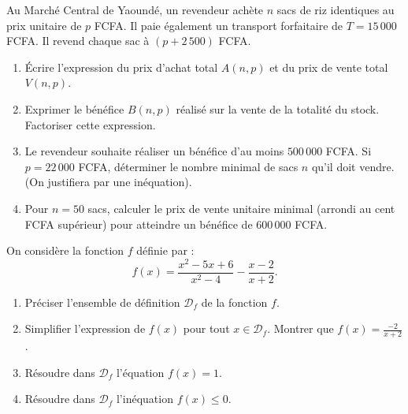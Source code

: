 \documentclass[11pt]{article}
\begin{document}
\begin{exercice}
Au Marché Central de Yaoundé, un revendeur achète $n$ sacs de riz identiques au prix unitaire de $p$ FCFA. Il paie également un transport forfaitaire de $T = 15\,000$ FCFA. Il revend chaque sac à $(p + 2\,500)$ FCFA.
\begin{enumerate}
    \item Écrire l'expression du prix d'achat total $A(n,p)$ et du prix de vente total $V(n,p)$.
    \item Exprimer le bénéfice $B(n,p)$ réalisé sur la vente de la totalité du stock. Factoriser cette expression.
    \item Le revendeur souhaite réaliser un bénéfice d'au moins $500\,000$ FCFA. Si $p = 22\,000$ FCFA, déterminer le nombre minimal de sacs $n$ qu'il doit vendre. (On justifiera par une inéquation).
    \item Pour $n = 50$ sacs, calculer le prix de vente unitaire minimal (arrondi au cent FCFA supérieur) pour atteindre un bénéfice de $600\,000$ FCFA.
\end{enumerate}
\end{exercice}

\begin{exercice}
On considère la fonction $f$ définie par :
\[
f(x) = \frac{x^2 - 5x + 6}{x^2 - 4} - \frac{x - 2}{x + 2}.
\]
\begin{enumerate}
    \item Préciser l'ensemble de définition $\mathcal{D}_f$ de la fonction $f$.
    \item Simplifier l'expression de $f(x)$ pour tout $x \in \mathcal{D}_f$. Montrer que $f(x) = \frac{-2}{x+2}$.
    \item Résoudre dans $\mathcal{D}_f$ l'équation $f(x) = 1$.
    \item Résoudre dans $\mathcal{D}_f$ l'inéquation $f(x) \leq 0$.
\end{enumerate}
\end{exercice}
\end{document}
